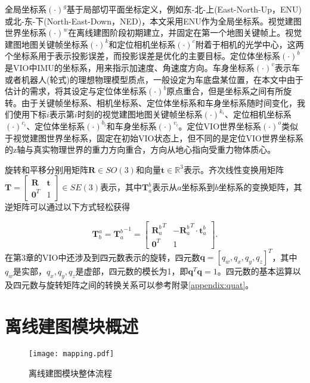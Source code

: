 全局坐标系$(\cdot)^{g}$基于局部切平面坐标定义，例如东-北-上(East-North-Up，ENU)或北-东-下(North-East-Down，NED)，本文采用ENU作为全局坐标系。视觉建图世界坐标系$(\cdot)^{w}$在离线建图阶段初期建立，并固定在第一个地图关键帧上。视觉建图地图关键帧坐标系$(\cdot)^{k}$和定位相机坐标系$(\cdot)^{c}$附着于相机的光学中心，这两个坐标系用于表示投影误差，而投影误差是优化的主要目标。定位体坐标系$(\cdot)^{b}$是VIO中IMU的坐标系，用来指示加速度、角速度方向。车身坐标系$(\cdot)^{v}$表示车或者机器人(轮式)的理想物理模型质点，一般设定为车底盘某位置，在本文中由于估计的需求，将其设定与定位体坐标系$(\cdot)^{b}$原点重合，但是坐标系之间有所旋转。由于关键帧坐标系、相机坐标系、定位体坐标系和车身坐标系随时间变化，我们使用下标$i$表示第$i$时刻的视觉建图地图关键帧坐标系$(\cdot)^{k_i}$、定位相机坐标系$(\cdot)^{c_i}$、定位体坐标系$(\cdot)^{b_i}$和车身坐标系$(\cdot)^{v_i}$。定位VIO世界坐标系$(\cdot)^{o}$类似于视觉建图世界坐标系，固定在初始VIO状态上，但不同的是定位VIO世界坐标系的z轴与真实物理世界的重力方向重合，方向从地心指向受重力物体质心。

旋转和平移分别用矩阵$\mathbf{R} \in SO(3)$和向量$\mathbf{t} \in \mathbb{R}^{3}$表示。齐次线性变换用矩阵$\mathbf{T} = \begin{bmatrix} \mathbf{R} & \mathbf{t} \\ \mathbf{0}^T & 1 \end{bmatrix} \in SE(3)$表示，其中$\mathbf{T}_{a}^{b}$表示从$a$坐标系到$b$坐标系的变换矩阵，其逆矩阵可以通过以下方式轻松获得

\begin{equation}
  \mathbf{T}^a_b = {\mathbf{T}_a^b}^{-1} = \begin{bmatrix} {\mathbf{R}_a^b}^T & -{\mathbf{R}_a^b}^T\cdot\mathbf{t}_a^b \\ \mathbf{0}^T & 1 \end{bmatrix}.
\end{equation}
在第3章的VIO中还涉及到四元数表示的旋转，四元数$\mathbf{q} = [q_w, q_x, q_y, q_z]^T$，其中$q_w$是实部，$q_x, q_y, q_z$是虚部，四元数的模长为1，即$\mathbf{q}^T\mathbf{q} = 1$。四元数的基本运算以及四元数与旋转矩阵之间的转换关系可以参考附录\ref{appendix:quat}。

\section{离线建图模块概述}

\begin{figure}
  \centering
  \texttt{[image: mapping.pdf]}
  \caption{离线建图模块整体流程}
  \label{fig:mapping}
\end{figure}

